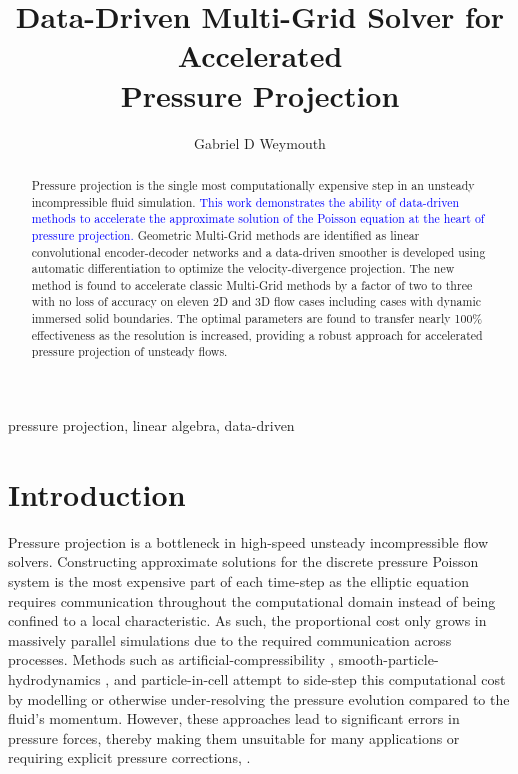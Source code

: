 \documentclass[]{elsarticle}
\begin{document}
\begin{frontmatter}

\title{Data-Driven Multi-Grid Solver for Accelerated \\ Pressure Projection}

\author{Gabriel D Weymouth}
\address{Engineering and Physical Sciences, University of Southampton, Southampton, UK}
\address{Data-Centric Engineering, Alan Turing Institute, London, UK}

\begin{abstract}
Pressure projection is the single most computationally expensive step in an unsteady incompressible fluid simulation. \textcolor{blue}{This work demonstrates the ability of data-driven methods to accelerate the approximate solution of the Poisson equation at the heart of pressure projection.} Geometric Multi-Grid methods are identified as linear convolutional encoder-decoder networks and a data-driven smoother is developed using automatic differentiation to optimize the velocity-divergence projection. The new method is found to accelerate classic Multi-Grid methods by a factor of two to three with no loss of accuracy on eleven 2D and 3D flow cases including cases with dynamic immersed solid boundaries. The optimal parameters are found to transfer nearly 100\% effectiveness as the resolution is increased, providing a robust approach for accelerated pressure projection of unsteady flows.
\end{abstract}

\begin{keyword}
pressure projection, linear algebra, data-driven
\end{keyword}

\end{frontmatter}

\section{Introduction}

Pressure projection is a bottleneck in high-speed unsteady incompressible flow solvers. Constructing approximate solutions for the discrete pressure Poisson system is the most expensive part of each time-step as the elliptic equation requires communication throughout the computational domain instead of being confined to a local characteristic. As such, the proportional cost only grows in massively parallel simulations due to the required communication across processes. Methods such as artificial-compressibility \cite{he2002comparison}, smooth-particle-hydrodynamics \cite{kiara2013sph}, and particle-in-cell \cite{jiang2017angular} attempt to side-step this computational cost by modelling or otherwise under-resolving the pressure evolution compared to the fluid's momentum. However, these approaches lead to significant errors in pressure forces, thereby making them unsuitable for many applications or requiring explicit pressure corrections, \cite{kiara2013sph}.
\end{document}
